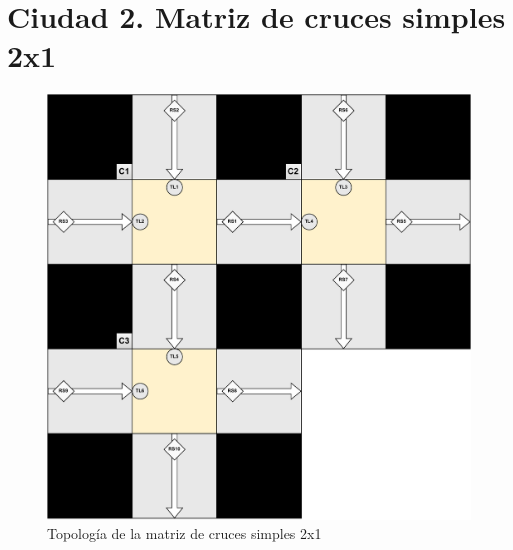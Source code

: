 \section{Ciudad 2. Matriz de cruces simples 2x1}
    \label{section:cruce_simple2x1}
\begin{figure}[H]
    \centering
    \includegraphics[width=1\linewidth]{text/image/DCruc-CSimple2x1-Topologia.pdf}
    \caption{Topología de la matriz de cruces simples 2x1}
    \label{fig:cruce_simple2x1_topologia}
\end{figure}

\newpage
